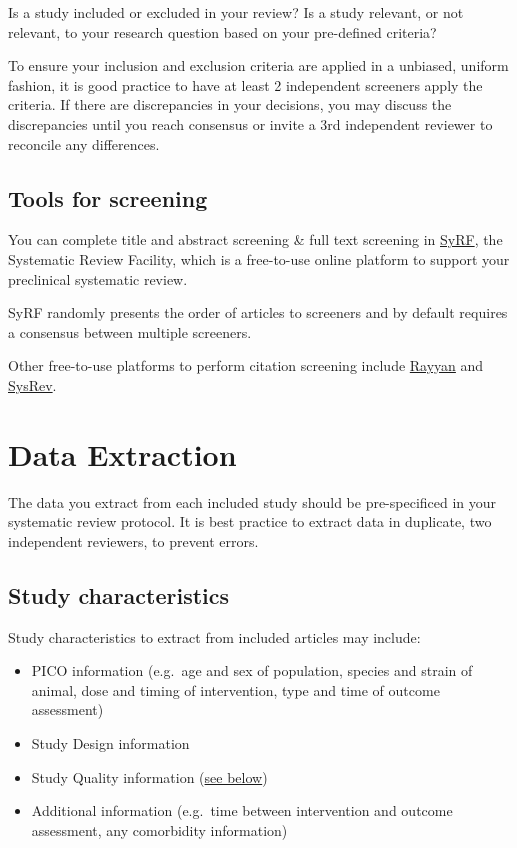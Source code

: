 \documentclass[
]{book}
\providecommand{\tightlist}{%
  \setlength{\itemsep}{0pt}\setlength{\parskip}{0pt}}
\begin{document}
Is a study included or excluded in your review? Is a study relevant, or not relevant, to your research question based on your pre-defined criteria?

To ensure your inclusion and exclusion criteria are applied in a unbiased, uniform fashion, it is good practice to have at least 2 independent screeners apply the criteria. If there are discrepancies in your decisions, you may discuss the discrepancies until you reach consensus or invite a 3rd independent reviewer to reconcile any differences.

\hypertarget{tools-for-screening}{%
\section{Tools for screening}\label{tools-for-screening}}

You can complete title and abstract screening \& full text screening in \href{https://syrf.org.uk/}{SyRF}, the Systematic Review Facility, which is a free-to-use online platform to support your preclinical systematic review.

SyRF randomly presents the order of articles to screeners and by default requires a consensus between multiple screeners.

Other free-to-use platforms to perform citation screening include \href{https://rayyan.qcri.org/welcome}{Rayyan} and \href{https://sysrev.com/}{SysRev}.

\hypertarget{data-extraction}{%
\chapter{Data Extraction}\label{data-extraction}}

The data you extract from each included study should be pre-specificed in your systematic review protocol. It is best practice to extract data in duplicate, two independent reviewers, to prevent errors.

\hypertarget{study-characteristics}{%
\section{Study characteristics}\label{study-characteristics}}

Study characteristics to extract from included articles may include:

\begin{itemize}
\tightlist
\item
  PICO information (e.g.~age and sex of population, species and strain of animal, dose and timing of intervention, type and time of outcome assessment)
\item
  Study Design information
\item
  Study Quality information (\protect\hyperlink{Quality-Assessment}{see below})
\item
  Additional information (e.g.~time between intervention and outcome assessment, any comorbidity information)
\end{itemize}
\end{document}
